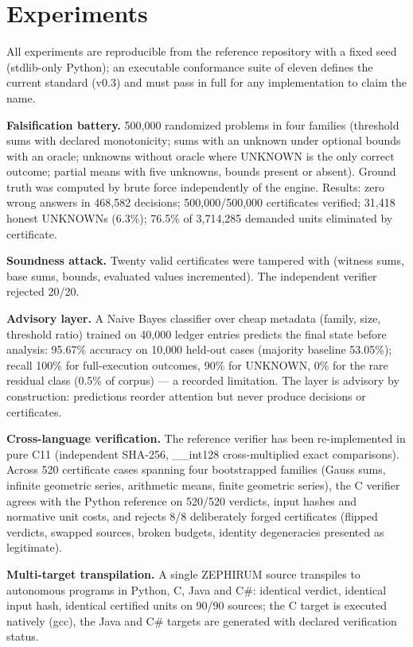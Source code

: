 \documentclass[11pt,a4paper]{article}
\begin{document}
\section{Experiments}
All experiments are reproducible from the reference repository with a fixed
seed (stdlib-only Python); an executable conformance suite of eleven
defines the current standard (v0.3) and must pass in full for any
implementation to claim the name.

\textbf{Falsification battery.} 500{,}000 randomized problems in four
families (threshold sums with declared monotonicity; sums with an unknown under
optional bounds with an oracle; unknowns without oracle where UNKNOWN is the
only correct outcome; partial means with five unknowns, bounds present or
absent). Ground truth was computed by brute force independently of the engine.
Results: zero wrong answers in 468{,}582 decisions; 500{,}000/500{,}000
certificates verified; 31{,}418 honest UNKNOWNs (6.3\%); 76.5\% of 3{,}714{,}285
demanded units eliminated by certificate.

\textbf{Soundness attack.} Twenty valid certificates were tampered with
(witness sums, base sums, bounds, evaluated values incremented). The
independent verifier rejected 20/20.

\textbf{Advisory layer.} A Naive Bayes classifier over cheap metadata
(family, size, threshold ratio) trained on 40{,}000 ledger entries predicts the
final state before analysis: 95.67\% accuracy on 10{,}000 held-out cases
(majority baseline 53.05\%); recall 100\% for full-execution outcomes, 90\% for
UNKNOWN, 0\% for the rare residual class (0.5\% of corpus) --- a recorded
limitation. The layer is advisory by construction: predictions reorder
attention but never produce decisions or certificates.

\textbf{Cross-language verification.} The reference verifier has been
re-implemented in pure C11 (independent SHA-256, \_\_int128 cross-multiplied
exact comparisons). Across 520 certificate cases spanning four bootstrapped
families (Gauss sums, infinite geometric series, arithmetic means, finite
geometric series), the C verifier agrees with the Python reference on
520/520 verdicts, input hashes and normative unit costs, and rejects 8/8
deliberately forged certificates (flipped verdicts, swapped sources, broken
budgets, identity degeneracies presented as legitimate).

\textbf{Multi-target transpilation.} A single ZEPHIRUM source transpiles to
autonomous programs in Python, C, Java and C\#: identical verdict, identical
input hash, identical certified units on 90/90 sources; the C target is
executed natively (gcc), the Java and C\# targets are generated with declared
verification status.
\end{document}
